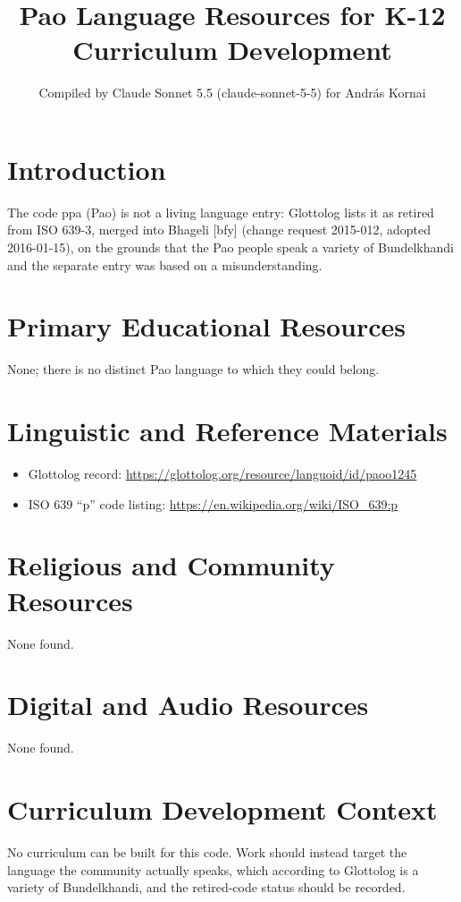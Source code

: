\documentclass[12pt]{article}
\title{Pao Language Resources for K-12 Curriculum Development}
\author{Compiled by Claude Sonnet 5.5 (claude-sonnet-5-5) for Andr\'as Kornai}
\date{}
\begin{document}
\maketitle

\section{Introduction}
The code ppa (Pao) is not a living language entry: Glottolog lists it as retired from ISO 639-3, merged into Bhageli [bfy] (change request 2015-012, adopted 2016-01-15), on the grounds that the Pao people speak a variety of Bundelkhandi and the separate entry was based on a misunderstanding.

\section{Primary Educational Resources}
None; there is no distinct Pao language to which they could belong.

\section{Linguistic and Reference Materials}
\begin{itemize}
\item Glottolog record: \url{https://glottolog.org/resource/languoid/id/paoo1245}
\item ISO 639 ``p'' code listing: \url{https://en.wikipedia.org/wiki/ISO_639:p}
\end{itemize}

\section{Religious and Community Resources}
None found.

\section{Digital and Audio Resources}
None found.

\section{Curriculum Development Context}
No curriculum can be built for this code. Work should instead target the language the community actually speaks, which according to Glottolog is a variety of Bundelkhandi, and the retired-code status should be recorded.
\end{document}

